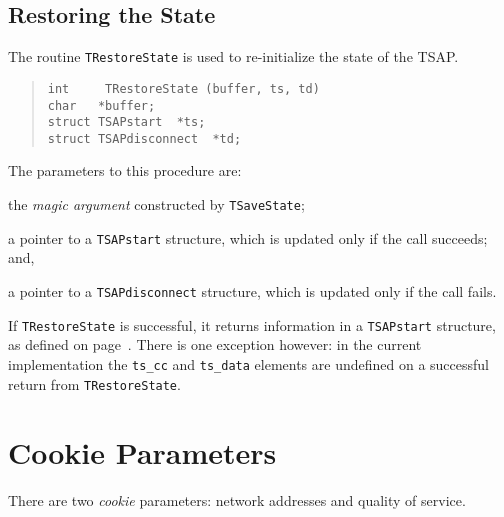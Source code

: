 \subsection	{Restoring the State}
The routine \verb"TRestoreState" is used to re-initialize the state of the
TSAP.
\begin{quote}\small\begin{verbatim}
int     TRestoreState (buffer, ts, td)
char   *buffer;
struct TSAPstart  *ts;
struct TSAPdisconnect  *td;
\end{verbatim}\end{quote}
The parameters to this procedure are:
\begin{describe}
\item[\verb"buffer":] the {\em magic argument\/} constructed by
\verb"TSaveState";

\item[\verb"ts":] a pointer to a \verb"TSAPstart" structure, which is updated
only if the call succeeds;
and,

\item[\verb"td":] a pointer to a \verb"TSAPdisconnect" structure, which is
updated only if the call fails.
\end{describe}
If \verb"TRestoreState" is successful,
it returns information in a \verb"TSAPstart" structure,
as defined on page~\pageref{TSAPstart}.
There is one exception however:
in the current implementation the \verb"ts_cc" and
\verb"ts_data" elements are undefined on a successful return from
\verb"TRestoreState".

\section	{Cookie Parameters}
There are two {\em cookie\/} parameters:
network addresses and quality of service.

